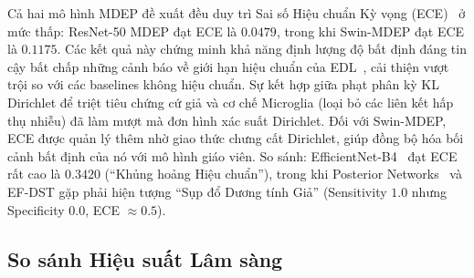\documentclass[11pt, a4paper]{article}
\begin{document}
Cả hai mô hình MDEP đề xuất đều duy trì Sai số Hiệu chuẩn Kỳ vọng (ECE)~\cite{naeini2015obtaining} ở mức thấp: ResNet-50 MDEP đạt ECE là $0.0479$, trong khi Swin-MDEP đạt ECE là $0.1175$. Các kết quả này chứng minh khả năng định lượng độ bất định đáng tin cậy bất chấp những cảnh báo về giới hạn hiệu chuẩn của EDL~\cite{shen2024mirage}, cải thiện vượt trội so với các baselines không hiệu chuẩn. Sự kết hợp giữa phạt phân kỳ KL Dirichlet để triệt tiêu chứng cứ giả và cơ chế Microglia (loại bỏ các liên kết hấp thụ nhiễu) đã làm mượt mà đơn hình xác suất Dirichlet. Đối với Swin-MDEP, ECE được quản lý thêm nhờ giao thức chưng cất Dirichlet, giúp đồng bộ hóa bối cảnh bất định của nó với mô hình giáo viên. So sánh: EfficientNet-B4~\cite{tan2019efficientnet} đạt ECE rất cao là $0.3420$ (``Khủng hoảng Hiệu chuẩn''), trong khi Posterior Networks~\cite{charpentier2020posterior} và EF-DST gặp phải hiện tượng ``Sụp đổ Dương tính Giả'' (Sensitivity $1.0$ nhưng Specificity $0.0$, ECE $\approx 0.5$).

\subsection{So sánh Hiệu suất Lâm sàng}

\begin{table}[H]
\centering
\caption{So sánh Hiệu suất Lâm sàng và Độ Hiệu chuẩn trên Phân phối Lệch pha (ISIC 2024).}
\label{tab:results}
\end{table}
\end{document}
